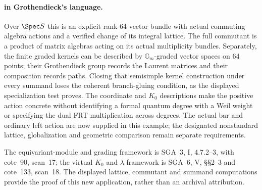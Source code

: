 \paragraph{ in Grothendieck's language.}
Over $\Spec S$ this is an explicit rank-64 vector bundle with
actual commuting algebra actions and a verified change of its
integral lattice. The full commutant is a product of matrix
algebras acting on its actual multiplicity bundles.
Separately, the finite graded kernels can be described by
$\mathbb G_m$-graded vector spaces on 64 points; their
Grothendieck group records the Laurent matrices and their
composition records paths. Closing that semisimple kernel
construction under every summand loses the coherent branch-gluing
condition, as the displayed specialization test proves.
The coordinate and $K_0$ descriptions make the positive action
concrete without identifying a formal quantum degree with a Weil
weight or specifying the dual FRT multiplication across degrees.
The actual bar and ordinary left action are now supplied in this
example; the designated nonstandard lattice, globalization and
geometric comparison remain separate requirements.

The equivariant-module and grading framework is SGA~3, I,
4.7.2--3, with cote~90, scan~17; the virtual $K_0$ and $\lambda$
framework is SGA~6, V, \S\S2--3 and cote~133, scan~18.
The displayed lattice, commutant and summand computations provide
the proof of this new application, rather than an archival attribution.
